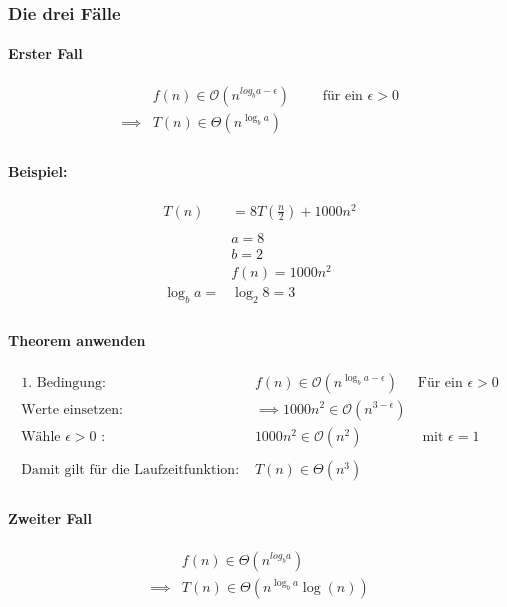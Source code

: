 \documentclass[a4paper]{scrartcl}
\begin{document}
	\subsubsection{Die drei Fälle}
	\paragraph{Erster Fall}
	\begin{align*}
		&f(n) \in \mathcal{O}(n^{log_b a - \epsilon }) \qquad \text{ für ein } \epsilon >0\\
		\implies& T(n) \in \Theta(n^{\log_b a})\\
	\end{align*}
	\paragraph{Beispiel:}
	\begin{align*}
		T(n)  &= 8T(\frac{n}{2}) +1000n^2 \\
		\\
		&a =8\\
		&b = 2\\
		&f(n) = 1000n^2\\
		\log _b a=  &\log_2 8 = 3\\
	\end{align*}
	
	\paragraph{Theorem anwenden}
	\begin{align*}
		\text{1. Bedingung: } &f(n) \in \mathcal{O}(n^{\log_b a- \epsilon})& \text{Für ein }  \epsilon > 0\\
		\text{Werte einsetzen: } &\implies 1000n^2 \in \mathcal{O}(n^{3 - \epsilon})\\
		\text{Wähle \(\epsilon > 0\) : }  & 1000n^2 \in \mathcal{O}(n^2)& \text{ mit } \epsilon = 1\\
		\\
		\text{Damit gilt für die Laufzeitfunktion: } &T(n) \in \Theta(n^3)\\ 
	\end{align*}

	\newpage
	\paragraph{Zweiter Fall}
	\begin{align*}
	&f(n) \in \Theta(n^{log_b a}) \\
	\implies& T(n) \in \Theta(n^{\log_b a} \log (n))\\
	\end{align*}
	
\end{document}
